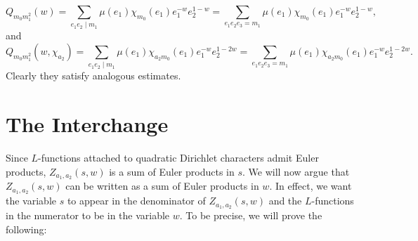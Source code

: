 \documentclass[12pt,reqno,oneside]{amsart}
\begin{document}
    \[
        Q_{m_{0}m_{1}^{2}}(w) = \sum_{e_{1}e_{2} \mid m_{1}}\mu(e_{1})\chi_{m_{0}}(e_{1})e_{1}^{-w}e_{2}^{1-w} = \sum_{e_{1}e_{2}e_{3} = m_{1}}\mu(e_{1})\chi_{m_{0}}(e_{1})e_{1}^{-w}e_{2}^{1-w},
    \]
    and
    \[
        Q_{m_{0}m_{1}^{2}}(w,\chi_{a_{2}}) = \sum_{e_{1}e_{2} \mid m_{1}}\mu(e_{1})\chi_{a_{2}m_{0}}(e_{1})e_{1}^{-w}e_{2}^{1-2w} = \sum_{e_{1}e_{2}e_{3} = m_{1}}\mu(e_{1})\chi_{a_{2}m_{0}}(e_{1})e_{1}^{-w}e_{2}^{1-2w}.
    \]
    Clearly they satisfy analogous estimates. 
\section{The Interchange}
    Since $L$-functions attached to quadratic Dirichlet characters admit Euler products, $Z_{a_{1},a_{2}}(s,w)$ is a sum of Euler products in $s$. We will now argue that $Z_{a_{1},a_{2}}(s,w)$ can be written as a sum of Euler products in $w$. In effect, we want the variable $s$ to appear in the denominator of $Z_{a_{1},a_{2}}(s,w)$ and the $L$-functions in the numerator to be in the variable $w$. To be precise, we will prove the following:
\end{document}
